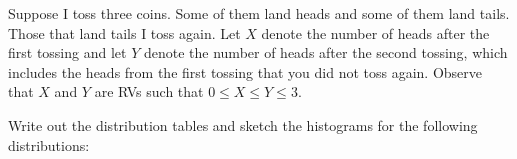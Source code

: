 \documentclass[addpoints,12pt]{exam}
\begin{document}
\begin{questions}
\addpoints

\question[6] Suppose I toss three coins. Some of them land heads and some of them land tails. Those that land tails I toss again. Let $X$ denote the number of heads after the first tossing and let $Y$ denote the number of heads after the second tossing, which includes the heads from the first tossing that you did not toss again. Observe that $X$ and $Y$ are RVs such that $0\leq X \leq Y \leq 3$.

Write out the distribution tables and sketch the histograms for the following distributions:

\noaddpoints
{}
\end{questions}
\end{document}
